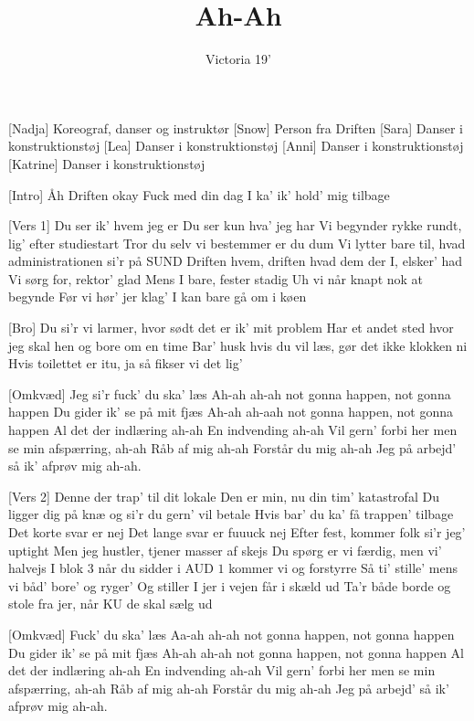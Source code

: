 \documentclass[a4paper,11pt]{article}
\title{Ah-Ah}
\author{Victoria 19'}
\begin{document}
\maketitle

\begin{roles}
[Nadja] Koreograf, danser og instruktør
[Snow] Person fra Driften 
[Sara] Danser i konstruktionstøj 
[Lea] Danser i konstruktionstøj 
[Anni] Danser i konstruktionstøj 
[Katrine] Danser i konstruktionstøj 
\end{roles}

\begin{song}
[Intro] Åh Driften okay
Fuck med din dag
I ka' ik' hold' mig tilbage

[Vers 1] Du ser ik' hvem jeg er
Du ser kun hva' jeg har
Vi begynder rykke rundt, lig' efter studiestart 
Tror du selv vi bestemmer er du dum 
Vi lytter bare til, hvad administrationen si'r på SUND
Driften hvem, driften hvad
dem der I, elsker' had
Vi sørg for, rektor' glad
Mens I bare, fester stadig
Uh vi når knapt nok at begynde
Før vi hør' jer klag' I kan bare gå om i køen

[Bro] Du si'r vi larmer, hvor sødt det er ik' mit problem
Har et andet sted hvor jeg skal hen og bore om en time
Bar' husk hvis du vil læs, gør det ikke klokken ni
Hvis toilettet er itu, ja så fikser vi det lig'

[Omkvæd] Jeg si'r fuck' du ska' læs
Ah-ah ah-ah not gonna happen, not gonna happen
Du gider ik' se på mit fjæs
Ah-ah ah-aah not gonna happen, not gonna happen
Al det der indlæring ah-ah 
En indvending ah-ah
Vil gern' forbi her men se min afspærring, ah-ah
Råb af mig ah-ah
Forstår du mig ah-ah
Jeg på arbejd' så ik' afprøv mig ah-ah. 

[Vers 2] Denne der trap' til dit lokale 
Den er min, nu din tim' katastrofal 
Du ligger dig på knæ og si'r du gern' vil betale
Hvis bar' du ka' få trappen' tilbage
Det korte svar er nej
Det lange svar er fuuuck nej
Efter fest, kommer folk si'r jeg' uptight
Men jeg hustler, tjener masser af skejs
Du spørg er vi færdig, men vi' halvejs 
I blok $3$ når du sidder i AUD $1$ kommer vi og forstyrre
Så ti' stille' mens vi båd' bore' og ryger' 
Og stiller I jer i vejen får i skæld ud
Ta'r både borde og stole fra jer, når KU de skal sælg ud 

[Omkvæd] Fuck' du ska' læs
Aa-ah ah-ah not gonna happen, not gonna happen
Du gider ik' se på mit fjæs
Ah-ah ah-ah not gonna happen, not gonna happen
Al det der indlæring ah-ah 
En indvending ah-ah
Vil gern' forbi her men se min afspærring, ah-ah
Råb af mig ah-ah
Forstår du mig ah-ah
Jeg på arbejd' så ik' afprøv mig ah-ah.
  
\end{song}
\end{document}
